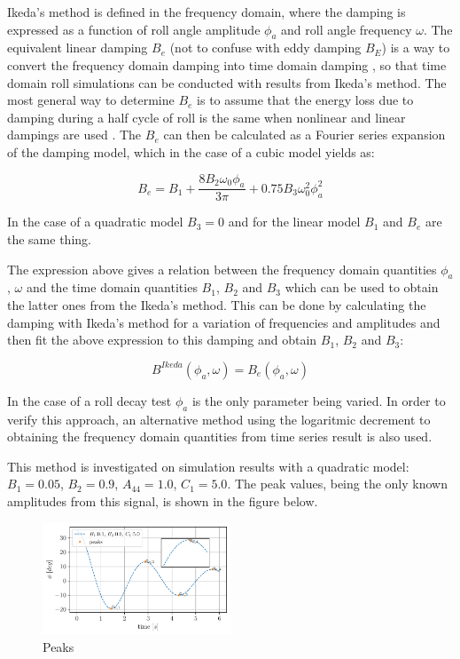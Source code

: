  \label{se:time_and_frequency} Ikeda's method is defined in the
frequency domain, where the damping is expressed as a function of roll
angle amplitude $\phi_a$ and roll angle frequency $\omega$. The
equivalent linear damping $B_e$ (not to confuse with eddy damping
$B_E$) is a way to convert the frequency domain damping into time
domain damping \cite{7505983/FB64RGPF}, so that time domain roll
simulations can be conducted with results from Ikeda's method. The most
general way to determine $B_e$ is to assume that the energy loss due
to damping during a half cycle of roll is the same when nonlinear and
linear dampings are used \cite{7505983/RYUBZITQ}. The $B_e$ can then
be calculated as a Fourier series expansion of the damping model, which
in the case of a cubic model yields as:
 
            
    
    \begin{equation}
B_{e} = B_{1} + \frac{8 B_{2} \omega_{0} \phi_{a}}{3 \pi} + 0.75 B_{3} \omega_{0}^{2} \phi_{a}^{2}
\label{eq:equation}
\end{equation}

    

    In the case of a quadratic model $B_3=0$ and for the linear model
$B_1$ and $B_e$ are the same thing.

    The expression above gives a relation between the frequency domain
quantities $\phi_a$, $\omega$ and the time domain quantities
$B_1$, $B_2$ and $B_3$ which can be used to obtain the latter ones
from the Ikeda's method. This can be done by calculating the damping
with Ikeda's method for a variation of frequencies and amplitudes and
then fit the above expression to this damping and obtain $B_1$,
$B_2$ and $B_3$:

\[B^{Ikeda}(\phi_a, \omega) = B_e(\phi_a, \omega)\]

In the case of a roll decay test $\phi_a$ is the only parameter being
varied. In order to verify this approach, an alternative method using
the logaritmic decrement \cite{7505983/BYNJ8CFG} to obtaining the
frequency domain quantities from time series result is also used.

This method is investigated on simulation results with a quadratic
model: $B_1 = 0.05$, $B_2 = 0.9$, $A_{44} = 1.0$, $C_1 = 5.0$.
The peak values, being the only known amplitudes from this signal, is
shown in the figure below.

    \begin{figure}[H]
        \begin{center}\includegraphics[width = 0.5\textwidth]{figures/peaks.pdf}\end{center}
        \vspace{-1cm}
        \caption{Peaks}
        \label{fig:peaks}
    \end{figure}
    
